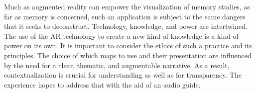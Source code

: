 Much as augmented reality can empower the visualization of memory studies, as far as memory is concerned, such an application is subject to the same dangers that it seeks to deconstruct. Technology, knowledge, and power are intertwined. The use of the AR technology to create a new kind of knowledge is a kind of power on its own. It is important to consider the ethics of such a practice and its principles. The choice of which maps to use and their presentation are influenced by the need for a clear, thematic, and augmentable narrative. As a result, contextualization is crucial for understanding as well as for transparency. The experience hopes to address that with the aid of an audio guide. 
